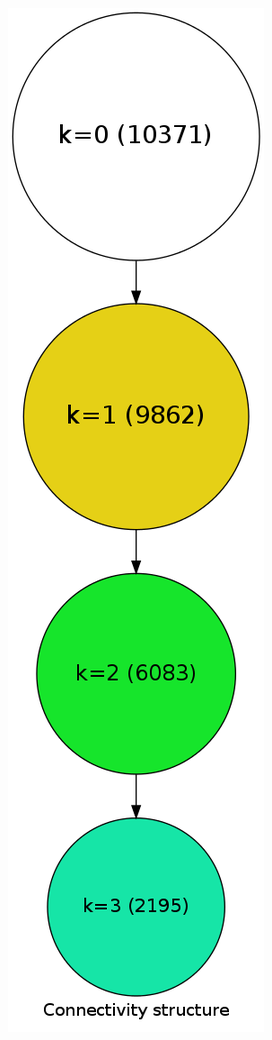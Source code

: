 \begin{landscape}
\begin{figure}[p]
{\includegraphics[scale=0.15]{figures/cohesive_blocks_nucl_th_2mode_random}
} 
\hspace{.2in}
\end{figure}
\end{landscape}
